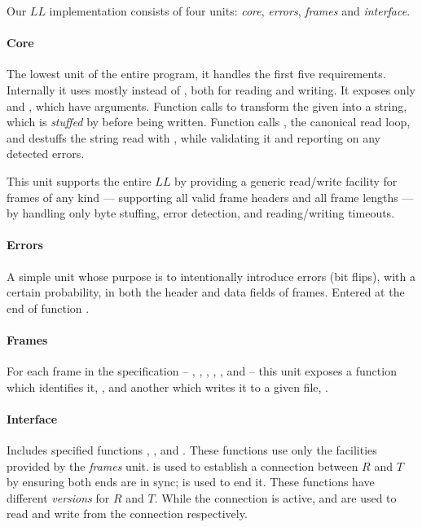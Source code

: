 \documentclass[main.tex]{subfiles}
\begin{document}
Our $LL$ implementation consists of four units: \emph{core}, \emph{errors}, \emph{frames} and \emph{interface}.

\paragraph{Core}
The lowest unit of the entire program, it handles the first five requirements.
Internally it uses mostly  instead of , both for reading and writing.
It exposes only  and , which have  arguments.
Function  calls  to transform the given  into a string, which is \textit{stuffed} by  before being written.
Function  calls , the canonical read loop, and destuffs the string read with , while validating it and reporting on any detected errors.

This unit supports the entire $LL$ by providing a generic read\slash write facility for frames of any kind --- supporting all valid frame headers and all frame lengths --- by handling only byte stuffing, error detection, and reading/writing timeouts.

\paragraph{Errors}
A simple unit whose purpose is to intentionally introduce errors (bit flips), with a certain probability, in both the header and data fields of frames. Entered at the end of function .

\paragraph{Frames}
For each frame in the specification -- \fI{}, \fSET{}, \fDISC{}, \fUA{}, \fRR{}, and \fREJ{} -- this unit exposes a function which identifies it, , and another which writes it to a given file, .

\paragraph{Interface}
Includes specified functions , ,  and .
These functions use only the facilities provided by the \emph{frames} unit.
 is used to establish a connection between $R$ and $T$ by ensuring both ends are in sync;  is used to end it.
These functions have different \textit{versions} for $R$ and $T$.
While the connection is active,  and  are used to read and write from the connection respectively.
\end{document}
